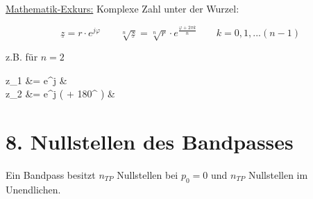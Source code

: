 \documentclass[a4paper, 12pt]{report}
\begin{document}
	\underline{Mathematik-Exkurs:} Komplexe Zahl unter der Wurzel:
	
	\[ \underline{z} = r \cdot e^{j\varphi} \qquad \sqrt[n]{\underline{z}} = \sqrt[n]{r} \cdot e^{\frac{\varphi + 2\pi k}{n}} \qquad k = 0, 1, ... (n-1) \]
	
	\begin{minipage}[t]{0.4\textwidth}
		\vspace{0.17cm}
		\begin{flushright}
			z.B. für $ n = 2 $
		\end{flushright}
	\end{minipage}
	\begin{minipage}[t]{0.6\textwidth}
		\vspace{-0.5cm}
		\begin{flalign*}
			\qquad z_1 &=  \cdot e^{j\varphi} &\\
			z_2 &=  \cdot e^{j \cdot ( \varphi + 180^{\circ} ) } &
		\end{flalign*}
	\end{minipage}
	
\section*{8. Nullstellen des Bandpasses}
	Ein Bandpass besitzt $ n_{TP} $ Nullstellen bei $ p_0 = 0 $ und $ n_{TP} $ Nullstellen im Unendlichen.
\end{document}
